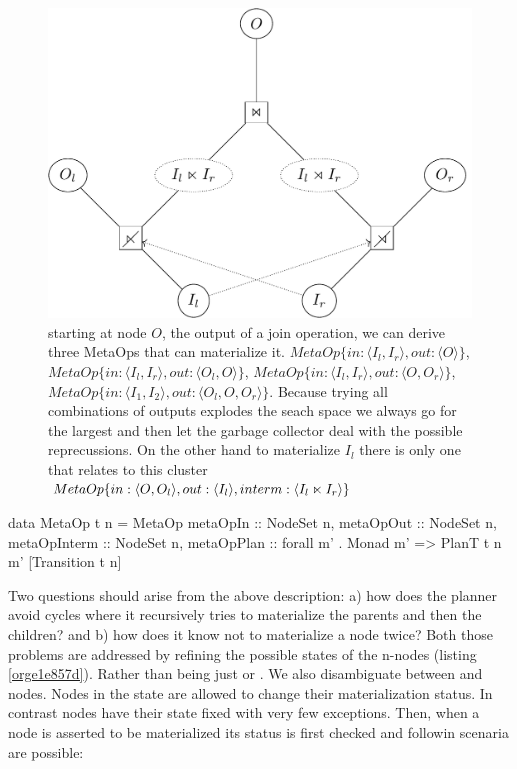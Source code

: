 \begin{figure}[p]
\centering
\includegraphics[width=.9\linewidth]{./imgs/example_metaop.pdf}
\caption{\label{fig:org8fe4b6e}starting at node \(O\), the output of a join operation, we can derive three MetaOps that can materialize it.  \(MetaOp\{in: \langle I_l, I_r \rangle, out: \langle O \rangle \}\), \(MetaOp\{in: \langle I_l, I_r \rangle, out: \langle O_l, O \rangle \}\), \(MetaOp\{in: \langle I_l, I_r \rangle, out: \langle O, O_r \rangle \}\), \(MetaOp\{in: \langle I_1, I_2 \rangle, out: \langle O_l, O, O_r \rangle \}\). Because trying all combinations of outputs explodes the seach space we always go for the largest and then let the garbage collector deal with the possible reprecussions. On the other hand to materialize \(I_l\) there is only one  that relates to this cluster \(MetaOp\{in:\langle O, O_l \rangle, out: \langle I_l \rangle, interm: \langle I_l \ltimes I_r \rangle \}\)}
\end{figure}

\begin{code}
\begin{haskellcode}
data MetaOp t n = MetaOp {
  metaOpIn     :: NodeSet n,
  metaOpOut    :: NodeSet n,
  metaOpInterm :: NodeSet n,
  metaOpPlan   :: forall m' . Monad m' => PlanT t n m' [Transition t n]
  }
\end{haskellcode}
\caption{\label{org682fa71}A  refers to input, output, and intermediate nodes that are involved in the set of operations it abstracts. Furthermore it contains a computation that registers and returns the transitions involved in the .}
\end{code}


Two questions should arise from the above description: a) how does the
planner avoid cycles where it recursively tries to materialize the
parents and then the children? and b) how does it know not to
materialize a node twice? Both those problems are addressed by
refining the possible states of the n-nodes (listing
\ref{orge1e857d}). Rather than being just  or . We also
disambiguate between  and  nodes. Nodes in the
 state are allowed to change their materialization status. In
contrast  nodes have their state fixed with very few
exceptions. Then, when a node is asserted to be materialized its
status is first checked and followin scenaria are possible:

